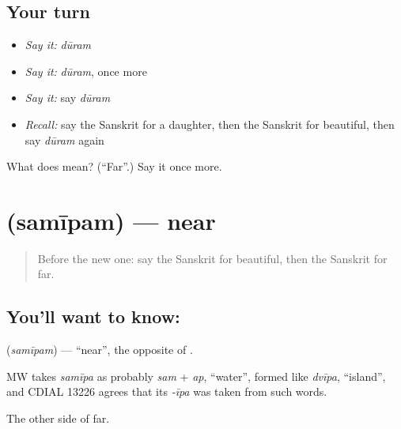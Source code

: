 \subsection*{Your turn}
\begin{itemize}
\raggedright
  \item \emph{Say it:} \emph{dūram}
  \item \emph{Say it:} \emph{dūram}, once more
  \item \emph{Say it:} say \emph{dūram}
  \item \emph{Recall:} say the Sanskrit for a daughter, then the Sanskrit for beautiful, then say \emph{dūram} again
\end{itemize}

\begin{tcolorbox}[breakable,colback=teal!4,colframe=teal!35!black,title={Before you move on}]
What does  mean? (\textquotedblleft{}Far\textquotedblright{}.) Say it once more.
\end{tcolorbox}
\section[\texorpdfstring{\sk{समीपम्} (samīpam)}{समीपम् (samīpam)}]{ (samīpam) — near}

\label{lesson:SA-C89-near}



\begin{quote}
Before the new one: say the Sanskrit for beautiful, then the Sanskrit for far.
\end{quote}

\subsection*{You'll want to know: }
\textbf{} (\emph{samīpam}) — \textquotedblleft{}near\textquotedblright{}, the opposite of \textbf{}.

\begin{cousinweb}
MW takes \emph{samīpa} as probably \emph{sam} + \emph{ap}, \textquotedblleft{}water\textquotedblright{}, formed like \emph{dvīpa}, \textquotedblleft{}island\textquotedblright{}, and CDIAL 13226 agrees that its \emph{-īpa} was taken from such words.
\end{cousinweb}

\begin{grammarlens}[title={What you've built}]
The other side of far.
\end{grammarlens}

